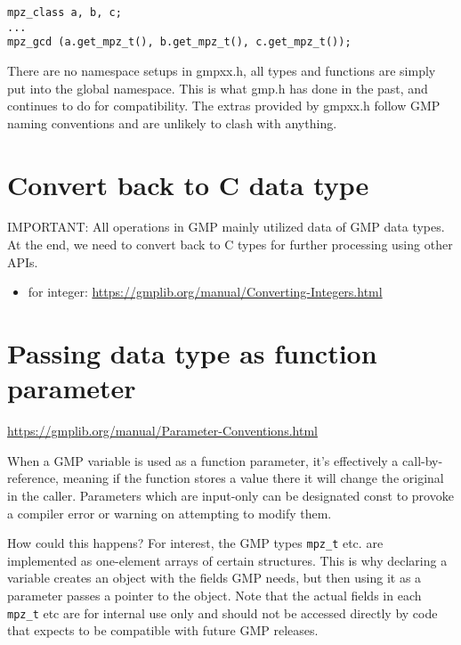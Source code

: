 \begin{verbatim}
mpz_class a, b, c;
...
mpz_gcd (a.get_mpz_t(), b.get_mpz_t(), c.get_mpz_t());
\end{verbatim}

There are no namespace setups in gmpxx.h, all types and functions are simply put
into the global namespace. This is what gmp.h has done in the past, and
continues to do for compatibility. The extras provided by gmpxx.h follow GMP
naming conventions and are unlikely to clash with anything.


\section{Convert back to C data type}

IMPORTANT: All operations in GMP mainly utilized data of GMP data types. 
At the end, we need to convert back to C types for further processing using
other APIs.

\begin{itemize}
  \item for integer:
  \url{https://gmplib.org/manual/Converting-Integers.html}
\end{itemize}

\section{Passing data type as function parameter}

\url{https://gmplib.org/manual/Parameter-Conventions.html}

When a GMP variable is used as a function parameter, it's effectively a
call-by-reference, meaning if the function stores a value there it will change
the original in the caller. Parameters which are input-only can be designated
const to provoke a compiler error or warning on attempting to modify them.

How could this happens? For interest, the GMP types \verb!mpz_t! etc. are
implemented as one-element arrays of certain structures. This is why declaring a
variable creates an object with the fields GMP needs, but then using it as a
parameter passes a pointer to the object. Note that the actual fields in each
\verb!mpz_t! etc are for internal use only and should not be accessed directly
by code that expects to be compatible with future GMP releases.

